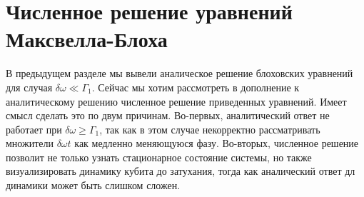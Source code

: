 \section{Численное решение уравнений Максвелла-Блоха}
\label{sec: maxbloch_num}
В предыдущем разделе мы вывели аналическое решение блоховских уравнений для случая $\delta\omega \ll \Gamma_1$. Сейчас мы хотим рассмотреть в дополнение к аналитическому решению численное решение приведенных уравнений. Имеет смысл сделать это по двум причинам. Во-первых,  аналитический ответ не работает при $\delta\omega \ge \Gamma_1$, так как в этом случае некорректно рассматривать множители $\delta\omega t$ как медленно меняющуюся фазу. Во-вторых, численное решение позволит не только узнать стационарное состояние системы, но также визуализировать динамику кубита до затухания, тогда как аналический ответ дл динамики может быть слишком сложен. 


